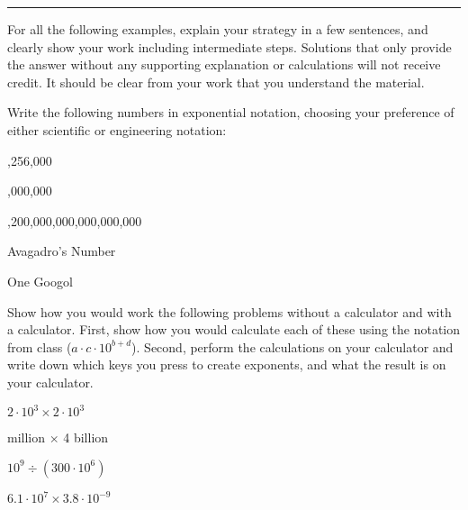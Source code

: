 \documentclass{article}
\begin{document}
\hrule
\vspace{10pt}



For all the following examples, explain your strategy in a few
sentences, and clearly show your work including intermediate steps.
Solutions that only provide the answer without any supporting
explanation or calculations will not receive credit.  It should be
clear from your work that you understand the material.

Write the following numbers in exponential notation, choosing your
preference of either scientific or engineering notation:

 

,256,000 


 

,000,000 


,200,000,000,000,000,000 


\subproblem Avagadro's Number 

\subproblem One Googol 



Show how you would work the following problems without a calculator and
with a calculator.  First, show how you would calculate each of these
using the notation from class ($a \cdot c \cdot 10^{b+d}$).  Second,
perform the calculations on your calculator and write down which keys
you press to create exponents, and what the result is on your
calculator.

\subproblem $2 \cdot 10^3 \times 2 \cdot 10^3$ 

 million $\times$ 4 billion 


\subproblem $10^9 \div (300 \cdot 10^6)$ 

\subproblem $ 6.1 \cdot 10^7 \times 3.8 \cdot 10^{-9} $
\end{document}
